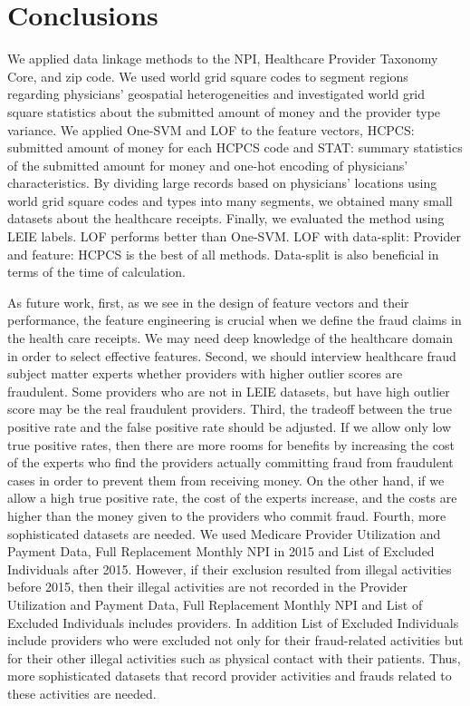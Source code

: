 \documentclass[dvipdfmx, english]{ampmt}             %
\begin{document}
\section{Conclusions}\label{sec:conclusions}
We applied data linkage methods to the NPI, Healthcare Provider Taxonomy Core, and zip code. We used world grid square codes to segment regions regarding physicians' geospatial heterogeneities and investigated world grid square statistics about the submitted amount of money and the provider type variance. We applied One-SVM and LOF to the feature vectors, HCPCS: submitted amount of money for each HCPCS code and STAT: summary statistics of the submitted amount for money and one-hot encoding of physicians'  characteristics. By dividing large records based on physicians' locations using world grid square codes and types into many segments, we obtained many small datasets about the healthcare receipts. Finally, we evaluated the method using LEIE labels. 
LOF performs better than One-SVM. LOF with data-split: Provider and feature: HCPCS is the best of all methods. Data-split is also beneficial in terms of the time of calculation.
\par
As future work, first, as we see in the design of feature vectors and their performance, the feature engineering is crucial when we define the fraud claims in the health care receipts. We may need deep knowledge of the healthcare domain in order to select effective features.
Second, we should interview healthcare fraud subject matter experts whether providers with higher outlier scores are fraudulent. Some providers who are not in LEIE datasets, but have high outlier score may be the real fraudulent providers.
Third, the tradeoff between the true positive rate and the false positive rate should be adjusted. If we allow only low true positive rates, then  there are more rooms for benefits by increasing the cost of the experts who find the providers actually committing fraud from fraudulent cases in order to prevent them from receiving money. On the other hand, if we allow a high true positive rate, the cost of the experts increase, and the costs are higher than the money given to the providers who commit fraud. 
Fourth, more sophisticated datasets are needed. We used Medicare Provider Utilization and Payment Data, Full Replacement Monthly NPI in 2015 and List of Excluded Individuals after 2015. However, if their exclusion resulted from illegal activities before 2015, then their illegal activities are not recorded in the Provider Utilization and Payment Data, Full Replacement Monthly NPI and List of Excluded Individuals includes providers. In addition List of Excluded Individuals include providers who were excluded not only for their fraud-related activities but for their other illegal activities such as physical contact with their patients. Thus, more sophisticated datasets that record provider activities and frauds related to these activities are needed.
\end{document}

